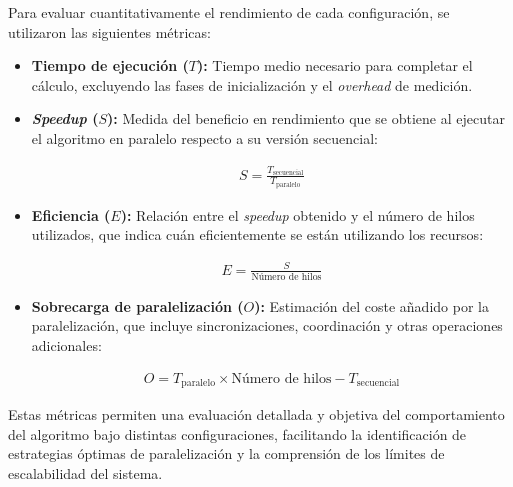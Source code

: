         Para evaluar cuantitativamente el rendimiento de cada configuración, se utilizaron las siguientes métricas:
        
        \begin{itemize}
        
            \item \textbf{Tiempo de ejecución ($T$):} Tiempo medio necesario para completar el cálculo, excluyendo las fases de inicialización y el \textit{overhead} de medición.
            
            \item \textbf{\textit{Speedup} ($S$):} Medida del beneficio en rendimiento que se obtiene al ejecutar el algoritmo en paralelo respecto a su versión secuencial:
            
                \begin{align}
                    S = \frac{T_{\text{secuencial}}}{T_{\text{paralelo}}}
                \end{align}
            
            \item \textbf{Eficiencia ($E$):} Relación entre el \textit{speedup} obtenido y el número de hilos utilizados, que indica cuán eficientemente se están utilizando los recursos:
            
                \begin{align}
                    E = \frac{S}{\text{Número de hilos}}
                \end{align}
                
            \item \textbf{Sobrecarga de paralelización ($O$):} Estimación del coste añadido por la paralelización, que incluye sincronizaciones, coordinación y otras operaciones adicionales:
            
                \begin{align}
                    O = T_{\text{paralelo}} \times \text{Número de hilos} - T_{\text{secuencial}}
                \end{align}
                
        \end{itemize}

        Estas métricas permiten una evaluación detallada y objetiva del comportamiento del algoritmo bajo distintas configuraciones, facilitando la identificación de estrategias óptimas de paralelización y la comprensión de los límites de escalabilidad del sistema.

